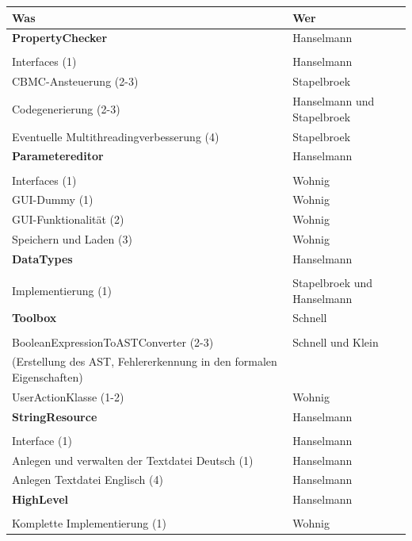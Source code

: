 \documentclass[a4paper]{scrreprt}
\begin{document}
\begin{tabular}{ | p{7cm} | p{7cm} |}
	\hline
	Was & Wer\\
	\hline
	
	\rule{0pt}{15pt}\textbf {PropertyChecker} & Hanselmann\\
	&\\
	\hline
	Interfaces (1) & Hanselmann\\
	\hline
	CBMC-Ansteuerung (2-3) & Stapelbroek \\
	\hline
	Codegenerierung (2-3) & Hanselmann und Stapelbroek \\
	\hline
	Eventuelle Multithreadingverbesserung (4) & Stapelbroek \\
	\hline
	
	\rule{0pt}{15pt}\textbf {Parametereditor} & Hanselmann \\
	&\\
	\hline
	Interfaces (1) & Wohnig\\
	\hline
	GUI-Dummy (1) & Wohnig\\
	\hline
	GUI-Funktionalität (2) & Wohnig\\
	\hline
	Speichern und Laden (3) & Wohnig\\
	\hline
	
	\rule{0pt}{15pt}\textbf {DataTypes} & Hanselmann\\
	&\\
	\hline
	Implementierung (1) & Stapelbroek und Hanselmann\\
	\hline	
	
	\rule{0pt}{15pt}\textbf {Toolbox} & Schnell\\
	&\\
	\hline	
	BooleanExpressionToASTConverter (2-3)  & Schnell und Klein\\
	(Erstellung des AST, Fehlererkennung in den formalen Eigenschaften) &\\
	\hline
	UserActionKlasse (1-2) & Wohnig\\
	\hline
	
	\rule{0pt}{15pt}\textbf {StringResource} & Hanselmann\\
	&\\
	\hline	
	Interface (1) & Hanselmann \\
	\hline
	Anlegen und verwalten der Textdatei Deutsch (1) & Hanselmann \\
	\hline
	Anlegen Textdatei Englisch (4) & Hanselmann \\
	\hline
	
	
	
	\rule{0pt}{15pt}\textbf {HighLevel} & Hanselmann\\
	&\\
	\hline
	Komplette Implementierung (1) & Wohnig\\
	\hline
	

\end{tabular}
\end{document}

